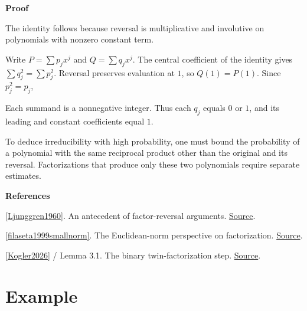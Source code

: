 \documentclass[11pt,a4paper,oneside,openany]{book}
\newcommand{\atlasdisplay}[1]{\par\begingroup\centering\vspace{3pt}\noindent\adjustbox{max width=\linewidth}{\(\displaystyle #1\)}\par\vspace{5pt}\endgroup}
\newenvironment{sources}{\par\smallskip\begingroup\footnotesize\color{atlasgray}\leftskip=10pt\setlength{\parskip}{2pt}}{\par\endgroup\smallskip}
\begin{document}
\begin{atlasblock}[standard]
\textbf{\sffamily Proof}\par\smallskip
\color{black} The identity follows because reversal is multiplicative and involutive on polynomials with nonzero constant term.\par
\color{black} Write \(P=\sum p_jx^j\) and \(Q=\sum q_jx^j\). The central coefficient of the identity gives \(\sum q_j^2=\sum p_j^2\). Reversal preserves evaluation at \(1\), so \(Q(1)=P(1)\). Since \(p_j^2=p_j\),\par

\atlasdisplay{\sum_jq_j(q_j-1)=0.}
\color{black} Each summand is a nonnegative integer. Thus each \(q_j\) equals \(0\) or \(1\), and its leading and constant coefficients equal \(1\).\par
\end{atlasblock}\color{black}
\color{black} To deduce irreducibility with high probability, one must bound the probability of a polynomial with the same reciprocal product other than the original and its reversal. Factorizations that produce only these two polynomials require separate estimates.\par
\begin{sources}
\textbf{References}\par\smallskip
\noindent\hyperlink{ref:Ljunggren1960}{[Ljunggren1960]}. An antecedent of factor-reversal arguments. \href{https://doi.org/10.7146/math.scand.a-10593}{Source}.\par
\noindent\hyperlink{ref:filaseta1999smallnorm}{[filaseta1999smallnorm]}. The Euclidean-norm perspective on factorization. \href{https://doi.org/10.1515/9783110285581.143}{Source}.\par
\noindent\hyperlink{ref:Kogler2026}{[Kogler2026]} / Lemma 3.1. The binary twin-factorization step. \href{https://arxiv.org/abs/2609.26771v2}{Source}.\par
\end{sources}\color{black}
\section{Example}
\end{document}
